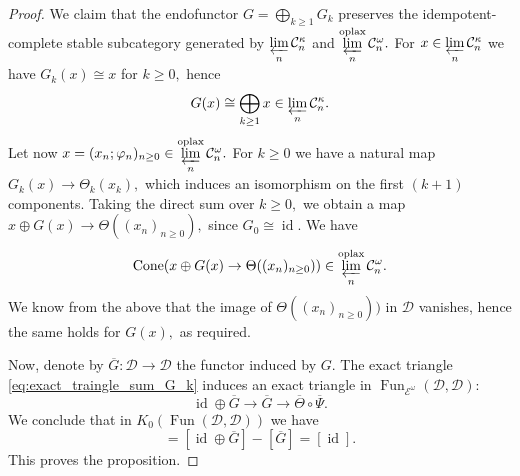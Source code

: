 \documentclass[11pt,leqno]{amsart}
\numberwithin{equation}{section}
\newcommand{\prolim}[1][]{\mathop{\varprojlim}\limits_{#1}}
\newcommand{\biggplus}[1][]{\mathop{\bigoplus}\limits_{#1}}
\newcommand{\bbar}{\overline}
\newcommand{\oplax}{\operatorname{oplax}}
\newcommand{\Cone}{\operatorname{Cone}}
\newcommand{\Fiber}{\operatorname{Fiber}}
\newcommand{\cont}{\operatorname{cont}}
\newcommand{\cD}{{\mathcal D}}
\newcommand{\cC}{{\mathcal C}}
\newcommand{\cE}{{\mathcal E}}
\newcommand{\Fun}{\operatorname{Fun}}
\newcommand{\Calk}{\operatorname{Calk}}
\newcommand{\id}{\operatorname{id}}
\begin{document}
\begin{proof}
We claim that the endofunctor $G=\biggplus[k\geq 1] G_k$ preserves the idempotent-complete stable subcategory generated by $\prolim[n]\cC_n^{\kappa}$ and $\prolim[n]^{\oplax}\cC_n^{\omega}.$ For $x\in \prolim[n]\cC_n^{\kappa}$ we have $G_k(x)\cong x$ for $k\geq 0,$ hence 
\begin{equation*}
G(x)\cong \biggplus[k\geq 1] x\in \prolim[n]\cC_n^{\kappa}.
\end{equation*} 
Let now $x=(x_n;\varphi_n)_{n\geq 0}\in\prolim[n]^{\oplax}\cC_n^{\omega}.$ For $k\geq 0$ we have a natural map $G_k(x)\to\Theta_k(x_k),$ which induces an isomorphism on the first $(k+1)$ components. Taking the direct sum over $k\geq 0,$ we obtain a map $x\oplus G(x)\to\Theta((x_n)_{n\geq 0}),$ since $G_0\cong\id.$ We have
\begin{equation*}
\Cone(x\oplus G(x)\to \Theta((x_n)_{n\geq 0}))\in\prolim[n]^{\oplax}\cC_n^{\omega}.
\end{equation*}
We know from the above that the image of $\Theta((x_n)_{n\geq 0}))$ in $\cD$ vanishes, hence the same holds for $G(x),$ as required. 

Now, denote by $\bbar{G}:\cD\to\cD$ the functor induced by $G.$ The exact triangle \eqref{eq:exact_traingle_sum_G_k} induces an exact triangle in $\Fun_{\cE^{\omega}}(\cD,\cD):$
\begin{equation*}
\id\oplus\bbar{G}\to\bbar{G}\to \bbar{\Theta}\circ\bbar{\Psi}.
\end{equation*}
We conclude that in $K_0(\Fun(\cD,\cD))$ we have
\begin{equation*}
[\bbar{\Theta}\circ\bbar{\Psi}]=[\id\oplus\bbar{G}]-[\bbar{G}]=[\id].
\end{equation*}
This proves the proposition.
\end{proof}
\end{document}
